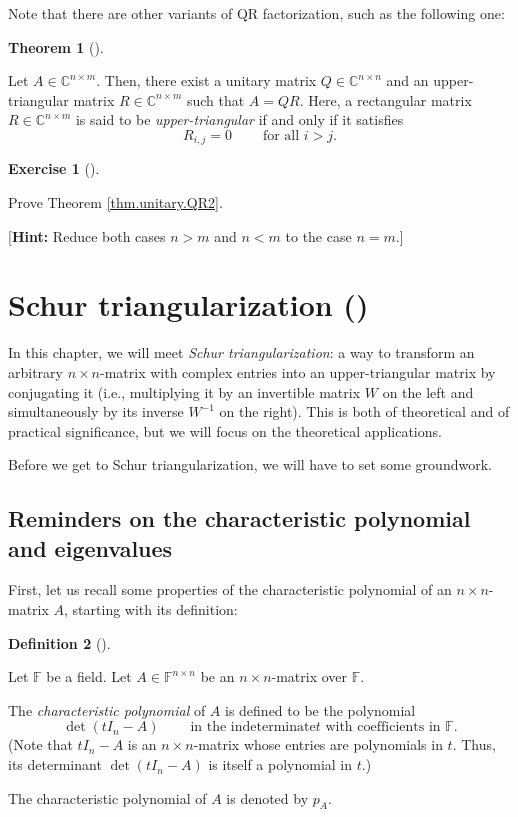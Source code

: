 \documentclass[numbers=enddot,12pt,final,onecolumn,notitlepage]{scrartcl}%
\newcounter{exer}
\numberwithin{exer}{subsection}
\theoremstyle{definition}
\newtheorem{theo}{Theorem}[subsection]
\newenvironment{theorem}[1][]
{\begin{theo}[#1]\begin{leftbar}}
{\end{leftbar}\end{theo}}
\newtheorem{defi}[theo]{Definition}
\newenvironment{definition}[1][]
{\begin{defi}[#1]\begin{leftbar}}
{\end{leftbar}\end{defi}}
\newtheorem{exmp}[exer]{Exercise}
\newenvironment{exercise}[1][]
{\begin{exmp}[#1]\begin{leftbar}}
{\end{leftbar}\end{exmp}}
\begin{document}
Note that there are other variants of QR factorization, such as the following one:

\begin{theorem}
[QR factorization, unitary version]\label{thm.unitary.QR2}Let $A\in
\mathbb{C}^{n\times m}$. Then, there exist a unitary matrix $Q\in
\mathbb{C}^{n\times n}$ and an upper-triangular matrix $R\in\mathbb{C}%
^{n\times m}$ such that $A=QR$. Here, a rectangular matrix $R\in
\mathbb{C}^{n\times m}$ is said to be \emph{upper-triangular} if and only if
it satisfies%
\[
R_{i,j}=0\ \ \ \ \ \ \ \ \ \ \text{for all }i>j.
\]

\end{theorem}

\begin{exercise}
\label{exe.unitary.QR2} Prove Theorem \ref{thm.unitary.QR2}.

[\textbf{Hint:} Reduce both cases $n>m$ and $n<m$ to the case $n=m$.]
\end{exercise}

\section{Schur triangularization (\cite[Chapter 2]{HorJoh13})}

In this chapter, we will meet \emph{Schur triangularization}: a way to
transform an arbitrary $n\times n$-matrix with complex entries into an
upper-triangular matrix by conjugating it (i.e., multiplying it by an
invertible matrix $W$ on the left and simultaneously by its inverse $W^{-1}$
on the right). This is both of theoretical and of practical significance, but
we will focus on the theoretical applications.

Before we get to Schur triangularization, we will have to set some groundwork.\setcounter{subsection}{-1}

\subsection{Reminders on the characteristic polynomial and eigenvalues}

First, let us recall some properties of the characteristic polynomial of an
$n\times n$-matrix $A$, starting with its definition:

\begin{definition}
\label{def.schurtri.ch.pA}Let $\mathbb{F}$ be a field. Let $A\in
\mathbb{F}^{n\times n}$ be an $n\times n$-matrix over $\mathbb{F}$.

The \emph{characteristic polynomial} of $A$ is defined to be the polynomial%
\[
\det\left(  tI_{n}-A\right)  \ \ \ \ \ \ \ \ \ \ \text{in the indeterminate
}t\text{ with coefficients in }\mathbb{F}.
\]
(Note that $tI_{n}-A$ is an $n\times n$-matrix whose entries are polynomials
in $t$. Thus, its determinant $\det\left(  tI_{n}-A\right)  $ is itself a
polynomial in $t$.)

The characteristic polynomial of $A$ is denoted by $p_{A}$.
\end{definition}
\end{document}
